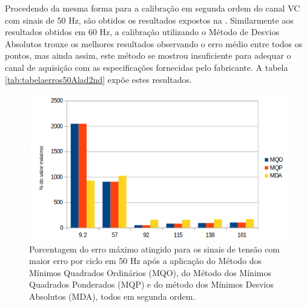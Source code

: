 \begin{table}[htb]
\end{table}
  
    Procedendo da mesma forma para a calibração em segunda ordem do canal VC com sinais de 50 Hz, são obtidos os resultados expostos na . Similarmente aos resultados obtidos em 60 Hz, a calibração utilizando o Método de Desvios Absolutos trouxe os melhores resultados observando o erro médio entre todos os pontos, mas ainda assim, este método se mostrou insuficiente para adequar o canal de aquisição com as especificações fornecidas pelo fabricante. A tabela \ref{tab:tabelaerros50Alad2nd} expõe estes resultados.

  \begin{figure}
    \caption{Porcentagem do erro máximo atingido para os sinais de tensão com maior erro por ciclo em 50 Hz após a aplicação do Método dos Mínimos Quadrados Ordinários (MQO), do Método dos Mínimos Quadrados Ponderados (MQP) e do método dos Mínimos Desvios Absolutos (MDA), todos em segunda ordem.}
    \label{fig:res_volt2nd50}
    \centering
    \includegraphics[width=0.9\linewidth]{pictures/50HzVC_2.png}
\end{figure}


